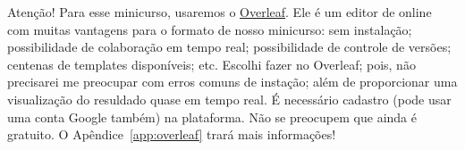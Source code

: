 \begin{atencao}{Atenção!}{\exclamacao} 
  Para esse minicurso, usaremos o \href{https://pt.overleaf.com/}{\textsf{Overleaf}}. 
  Ele é um editor de \LaTeXX online com muitas vantagens para o formato de nosso 
  minicurso: sem instalação; possibilidade de colaboração em tempo real; 
  possibilidade de controle de versões; centenas de templates disponíveis; etc. 
  Escolhi fazer no \textsf{Overleaf}; pois, não precisarei me preocupar com erros 
  comuns de instação; além de proporcionar uma visualização do resuldado quase 
  em tempo real. 
  É necessário cadastro (pode usar uma conta \textsf{Google} também) na plataforma. 
  Não se preocupem que ainda é gratuito. 
  O Apêndice~\ref{app:overleaf} trará mais informações! 
\end{atencao}
